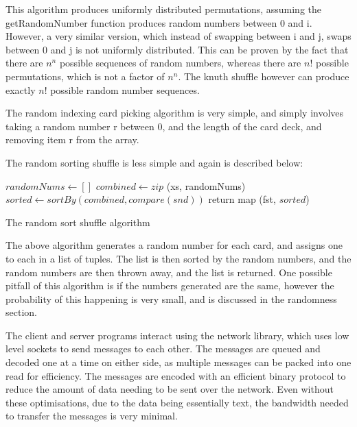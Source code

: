 \vspace{0.3cm}

This algorithm produces uniformly distributed permutations, assuming the
getRandomNumber function produces random numbers between 0 and i. However,
a very similar version, which instead of swapping between i and j, swaps
between 0 and j is not uniformly distributed. This can be proven by
the fact that there are $n^n$ possible sequences of random numbers, whereas
there are ${n!}$ possible permutations, which is not a factor of $n^n$.
The knuth shuffle however can produce exactly ${n!}$ possible random number
sequences. \parencite{website:rici2015}

The random indexing card picking algorithm is very simple, and simply involves
taking a random number r between 0, and the length of the card deck, and
removing item r from the array.

The random sorting shuffle is less simple and again is described below:

\vspace{0.3cm}

\begin{algorithm}[H]
    \BlankLine{}
    $randomNums \leftarrow []$\;
    $combined \leftarrow zip$ (xs, randomNums)\;
    $sorted \leftarrow sortBy ( combined, compare (snd))$\;
    return map (fst, $sorted$)\;
\caption{The random sort shuffle algorithm}
\end{algorithm}

\vspace{0.3cm}

The above algorithm generates a random number for each card, and assigns
one to each in a list of tuples. The list is then sorted by the random numbers,
and the random numbers are then thrown away, and the list is returned. One
possible pitfall of this algorithm is if the numbers generated are the same,
however the probability of this happening is very small, and is discussed
in the randomness section.

The client and server programs interact using the network library, which
uses low level sockets to send messages to each other. The messages are queued
and decoded one at a time on either side, as multiple messages can be packed
into one read for efficiency. The messages are encoded with an efficient binary
protocol to reduce the amount of data needing to be sent over the network.
Even without these optimisations, due to the data being essentially text, the
bandwidth needed to transfer the messages is very minimal.

